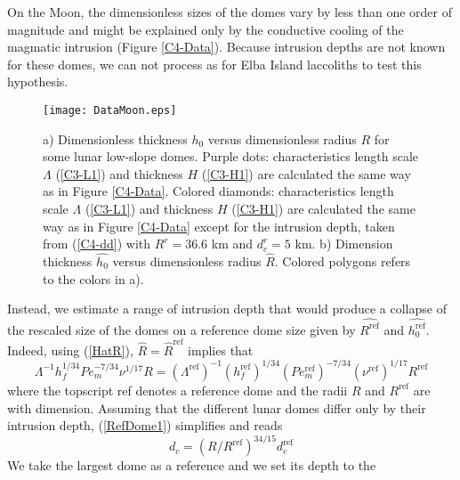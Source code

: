 On the  Moon, the dimensionless sizes  of the domes vary  by less than
one order of  magnitude and might be explained only  by the conductive
cooling  of the  magmatic intrusion  (Figure \ref{C4-Data}).   Because
intrusion depths are not known for  these domes, we can not process as
for Elba Island laccoliths to test this hypothesis.
\begin{figure}[h!]
  \begin{center}
    \graphicspath{ {/Users/thorey/Documents/These/Projet/Refroidissement/Skin_Model/Figure/Figure_Heating/} }
    \texttt{[image: DataMoon.eps]}
    \caption{  a) Dimensionless  thickness $h_0$  versus dimensionless
      radius  $R$  for  some  lunar  low-slope  domes.   Purple  dots:
      characteristics   length  scale   $\Lambda$  (\ref{C3-L1})   and
      thickness $H$  (\ref{C3-H1}) are calculated  the same way  as in
      Figure \ref{C4-Data}.  Colored  diamonds: characteristics length
      scale  $\Lambda$ (\ref{C3-L1})  and thickness  $H$ (\ref{C3-H1})
      are calculated  the same way  as in Figure  \ref{C4-Data} except
      for  the   intrusion  depth,   taken  from   (\ref{C4-dd})  with
      $R^r  =  36.6$ km  and  $d_c^r=5$  km.  b)  Dimension  thickness
      $\hat{h_0}$  versus  dimensionless  radius  $\hat{R}$.   Colored
      polygons refers to the colors in a).}
    \label{C4-ArrestMoon}
  \end{center}
\end{figure}
Instead, we estimate  a range of intrusion depth that  would produce a
collapse of  the rescaled size of  the domes on a  reference dome size
given by $\hat{R^{\text{ref}}}$ and $\hat{h_0^{\text{ref}}}$.  Indeed,
using (\ref{HatR}), $\hat{R}=\hat{R}^{\text{ref}}$ implies that
\begin{equation}
  \Lambda^{-1}h_f^{1/34}Pe_m^{-7/34}\nu^{1/17}R =   \left(\Lambda^{\text{ref}}\right)^{-1}\left(h_f^{\text{ref}}\right)^{1/34}\left(Pe_m^{\text{ref}}\right)^{-7/34}\left(\nu^{\text{ref}}\right)^{1/17}R^{\text{ref}}\label{RefDome1}
\end{equation}
where the topscript ref denotes a reference dome and the radii $R$ and
$R^{\text{ref}}$ are with dimension. Assuming that the different lunar
domes  differ   only  by   their  intrusion   depth,  (\ref{RefDome1})
simplifies and reads
\begin{equation}
  d_c = \left(R/R^{\text{ref}}\right)^{34/15}d_c^{\text{ref}}
  \label{C4-dd}
\end{equation}
We take the  largest dome as a  reference and we set its  depth to the
